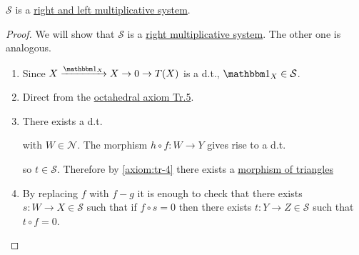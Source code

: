 \documentclass[../../main]{subfiles}
\begin{document}
\begin{lemma}
  \(\mathcal{S}\) is a \hyperref[def:multiplicative-system]{right and left multiplicative system}.
\end{lemma}
\begin{proof}
  We will show that \(\mathcal{S}\) is a \hyperref[def:multiplicative-system]{right multiplicative system}.
  The other one is analogous.
  \begin{enumerate}
    \item[\ref{axiom:multiplicative-id}] Since \(X \xrightarrow{\id_{X}} X \to 0 \to T(X)\) is a d.t., \(\id_{X} \in \mathcal{S}\).
    \item[\ref{axiom:multiplicative-composition}] Direct from the \hyperref[axiom:tr-5]{octahedral axiom Tr.5}.
    \item[\ref{axiom:multiplicative-diagram}] There exists a d.t.
          \begin{center}
          \end{center}
          with \(W \in \mathcal{N}\).
          The morphism \(h \circ f: W \to Y\) gives rise to a d.t.
          \begin{center}
          \end{center}
          so \(t \in \mathcal{S}\).
          Therefore by \ref{axiom:tr-4} there exists a \hyperref[def:triangle]{morphism of triangles}
          \begin{center}
          \end{center}
    \item[\ref{axiom:multiplicative-equaliser}] By replacing \(f\) with \(f-g\) it is enough to check that there exists \(s: W \to X \in \mathcal{S}\) such that if \(f \circ s = 0\) then there exists \(t: Y \to Z \in \mathcal{S}\) such that \(t \circ f = 0\).

\end{enumerate}
\end{proof}
\end{document}
